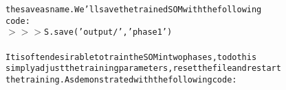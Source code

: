{{\begin{tabbing}
{\texttt{the\hspace{6pt}save\hspace{6pt}as\hspace{6pt}name.\hspace{6pt}We{'}ll\hspace{6pt}save\hspace{6pt}the\hspace{6pt}trained\hspace{6pt}SOM\hspace{6pt}with\hspace{6pt}the\hspace{6pt}following}}\\
{\texttt{code:}}\\
{\texttt{$>$$>$$>$\hspace{6pt}S.save({'}output/{'},{'}phase1{'})}}\\
\\
{\texttt{It\hspace{6pt}is\hspace{6pt}often\hspace{6pt}desirable\hspace{6pt}to\hspace{6pt}train\hspace{6pt}the\hspace{6pt}SOM\hspace{6pt}in\hspace{6pt}two\hspace{6pt}phases,\hspace{6pt}to\hspace{6pt}do\hspace{6pt}this}}\\
{\texttt{simply\hspace{6pt}adjust\hspace{6pt}the\hspace{6pt}training\hspace{6pt}parameters,\hspace{6pt}reset\hspace{6pt}the\hspace{6pt}file\hspace{6pt}and\hspace{6pt}restart}}\\
{\texttt{the\hspace{6pt}training.\hspace{6pt}As\hspace{6pt}demonstrated\hspace{6pt}with\hspace{6pt}the\hspace{6pt}following\hspace{6pt}code:}}\\

\end{tabbing}}}
